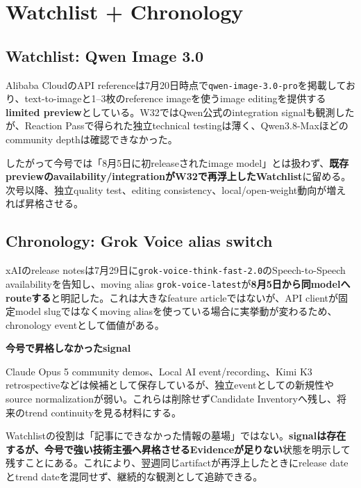 \section{Watchlist + Chronology}

\subsection*{Watchlist: Qwen Image 3.0}

Alibaba CloudのAPI referenceは7月20日時点で\texttt{qwen-image-3.0-pro}を掲載しており、text-to-imageと1--3枚のreference imageを使うimage editingを提供する\textbf{limited preview}としている\cite{qwen-image-30-api}。W32ではQwen公式のintegration signalも観測したが\cite{qwen-image-30-x-integration}、Reaction Passで得られた独立technical testingは薄く、Qwen3.8-Maxほどのcommunity depthは確認できなかった。

したがって今号では「8月5日に初releaseされたimage model」とは扱わず、\textbf{既存previewのavailability/integrationがW32で再浮上したWatchlist}に留める。次号以降、独立quality test、editing consistency、local/open-weight動向が増えれば昇格させる。

\subsection*{Chronology: Grok Voice alias switch}

xAIのrelease notesは7月29日に\texttt{grok-voice-think-fast-2.0}のSpeech-to-Speech availabilityを告知し、moving alias \texttt{grok-voice-latest}が\textbf{8月5日から同modelへrouteする}と明記した\cite{xai-voice-release-notes}。これは大きなfeature articleではないが、API clientが固定model slugではなくmoving aliasを使っている場合に実挙動が変わるため、chronology eventとして価値がある。

\begin{tcolorbox}[enhanced,breakable,colback=SurveySoft,colframe=SurveyRule,boxrule=0.4pt,arc=1mm,left=2mm,right=2mm,top=1.5mm,bottom=1.5mm]
\textbf{今号で昇格しなかったsignal}\par\smallskip
Claude Opus 5 community demos、Local AI event/recording、Kimi K3 retrospectiveなどは候補として保存しているが、独立eventとしての新規性やsource normalizationが弱い。これらは削除せずCandidate Inventoryへ残し、将来のtrend continuityを見る材料にする。
\end{tcolorbox}

Watchlistの役割は「記事にできなかった情報の墓場」ではない。\textbf{signalは存在するが、今号で強い技術主張へ昇格させるEvidenceが足りない}状態を明示して残すことにある。これにより、翌週同じartifactが再浮上したときにrelease dateとtrend dateを混同せず、継続的な観測として追跡できる。
